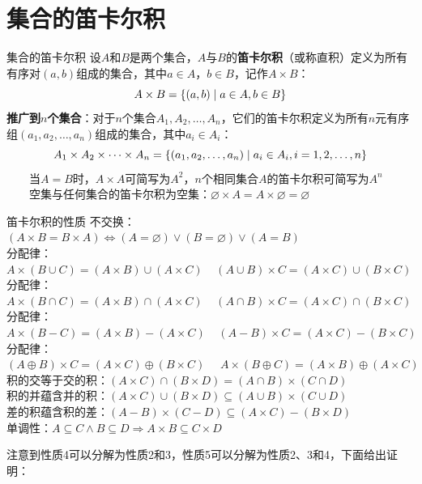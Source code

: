 \documentclass[lang=cn,11pt]{elegantbook}
\begin{document}
\section{集合的笛卡尔积}
\begin{definition}{集合的笛卡尔积}
设$A$和$B$是两个集合，$A$与$B$的\textbf{笛卡尔积}（或称直积）定义为所有有序对$(a,b)$组成的集合，其中$a \in A$，$b \in B$，记作$A \times B$：\vspace{-10pt}
$$A \times B = \{(a,b) \mid a \in A, b \in B\}\vspace{-10pt}$$
\textbf{推广到$n$个集合}：对于$n$个集合$A_1, A_2, \ldots, A_n$，它们的笛卡尔积定义为所有$n$元有序组$(a_1, a_2, \ldots, a_n)$组成的集合，其中$a_i \in A_i$：
\vspace{-10pt}$$A_1 \times A_2 \times \cdots \times A_n = \{(a_1, a_2, \ldots, a_n) \mid a_i \in A_i, i = 1,2,\ldots,n\}\vspace{-10pt}$$
~~~~当$A = B$时，$A \times A$可简写为$A^2$，$n$个相同集合$A$的笛卡尔积可简写为$A^n$\\
~~~~空集与任何集合的笛卡尔积为空集：$\varnothing \times A = A \times \varnothing = \varnothing$
\end{definition}
\begin{theorem}{笛卡尔积的性质}
不交换：$(A\times B=B\times A)\Leftrightarrow (A=\varnothing)\lor(B=\varnothing)\lor(A=B)$\\
分配律：$A\times(B\cup C)=(A\times B)\cup(A\times C)~~~~~(A\cup B)\times C=(A\times C)\cup(B\times C)$\\
分配律：$A\times(B\cap C)=(A\times B)\cap(A\times C)~~~~~(A\cap B)\times C=(A\times C)\cap(B\times C)$\\
分配律：$A\times(B-C)=(A\times B)-(A\times C)~~~~~(A-B)\times C=(A\times C)-(B\times C)$\\
分配律：$(A\oplus B)\times C=(A\times C)\oplus(B\times C)~~~~~~A\times(B\oplus C)=(A\times B)\oplus(A\times C)$\\
积的交等于交的积：$(A\times C)\cap(B\times D)=(A\cap B)\times(C\cap D)$\\
积的并蕴含并的积：$(A\times C)\cup(B\times D)\subseteq(A\cup B)\times(C\cup D)$\\
差的积蕴含积的差：$(A-B)\times(C-D)\subseteq (A\times C)-(B\times D)$\\
单调性：$A\subseteq C\land B\subseteq D\Rightarrow A\times B\subseteq C\times D$
\end{theorem}
注意到性质4可以分解为性质2和3，性质5可以分解为性质2、3和4，下面给出证明：\vspace{-10pt}
\end{document}
